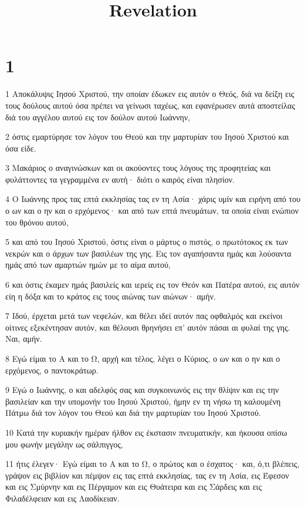 

\title{Revelation}


\chapter{1}

\par 1 Αποκάλυψις Ιησού Χριστού, την οποίαν έδωκεν εις αυτόν ο Θεός, διά να δείξη εις τους δούλους αυτού όσα πρέπει να γείνωσι ταχέως, και εφανέρωσεν αυτά αποστείλας διά του αγγέλου αυτού εις τον δούλον αυτού Ιωάννην,
\par 2 όστις εμαρτύρησε τον λόγον του Θεού και την μαρτυρίαν του Ιησού Χριστού και όσα είδε.
\par 3 Μακάριος ο αναγινώσκων και οι ακούοντες τους λόγους της προφητείας και φυλάττοντες τα γεγραμμένα εν αυτή· διότι ο καιρός είναι πλησίον.
\par 4 Ο Ιωάννης προς τας επτά εκκλησίας τας εν τη Ασία· χάρις υμίν και ειρήνη από του ο ων και ο ην και ο ερχόμενος· και από των επτά πνευμάτων, τα οποία είναι ενώπιον του θρόνου αυτού,
\par 5 και από του Ιησού Χριστού, όστις είναι ο μάρτυς ο πιστός, ο πρωτότοκος εκ των νεκρών και ο άρχων των βασιλέων της γης. Εις τον αγαπήσαντα ημάς και λούσαντα ημάς από των αμαρτιών ημών με το αίμα αυτού,
\par 6 και όστις έκαμεν ημάς βασιλείς και ιερείς εις τον Θεόν και Πατέρα αυτού, εις αυτόν είη η δόξα και το κράτος εις τους αιώνας των αιώνων· αμήν.
\par 7 Ιδού, έρχεται μετά των νεφελών, και θέλει ιδεί αυτόν πας οφθαλμός και εκείνοι οίτινες εξεκέντησαν αυτόν, και θέλουσι θρηνήσει επ' αυτόν πάσαι αι φυλαί της γης. Ναι, αμήν.
\par 8 Εγώ είμαι το Α και το Ω, αρχή και τέλος, λέγει ο Κύριος, ο ων και ο ην και ο ερχόμενος, ο παντοκράτωρ.
\par 9 Εγώ ο Ιωάννης, ο και αδελφός σας και συγκοινωνός εις την θλίψιν και εις την βασιλείαν και την υπομονήν του Ιησού Χριστού, ήμην εν τη νήσω τη καλουμένη Πάτμω διά τον λόγον του Θεού και διά την μαρτυρίαν του Ιησού Χριστού.
\par 10 Κατά την κυριακήν ημέραν ήλθον εις έκστασιν πνευματικήν, και ήκουσα οπίσω μου φωνήν μεγάλην ως σάλπιγγος,
\par 11 ήτις έλεγεν· Εγώ είμαι το Α και το Ω, ο πρώτος και ο έσχατος· και, ό,τι βλέπεις, γράψον εις βιβλίον και πέμψον εις τας επτά εκκλησίας, τας εν τη Ασία, εις Έφεσον και εις Σμύρνην και εις Πέργαμον και εις Θυάτειρα και εις Σάρδεις και εις Φιλαδέλφειαν και εις Λαοδίκειαν.

